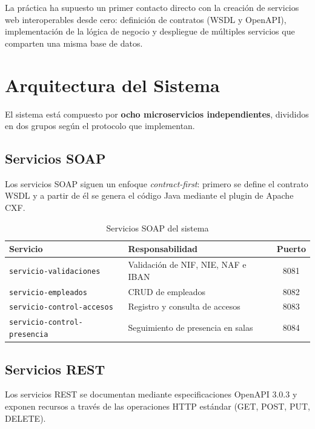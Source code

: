 \documentclass[12pt, a4paper]{article}
\begin{document}
La práctica ha supuesto un primer contacto directo con la creación de servicios web interoperables desde cero: definición de contratos (WSDL y OpenAPI), implementación de la lógica de negocio y despliegue de múltiples servicios que comparten una misma base de datos.

\section{Arquitectura del Sistema}

El sistema está compuesto por \textbf{ocho microservicios independientes}, divididos en dos grupos según el protocolo que implementan.

\subsection{Servicios SOAP}

Los servicios SOAP siguen un enfoque \textit{contract-first}: primero se define el contrato WSDL y a partir de él se genera el código Java mediante el plugin de Apache CXF.

\begin{table}[H]
  \centering
  \begin{tabular}{llc}
    \toprule
    \textbf{Servicio} & \textbf{Responsabilidad} & \textbf{Puerto} \\
    \midrule
    \texttt{servicio-validaciones}     & Validación de NIF, NIE, NAF e IBAN & 8081 \\
    \texttt{servicio-empleados}        & CRUD de empleados                   & 8082 \\
    \texttt{servicio-control-accesos}  & Registro y consulta de accesos      & 8083 \\
    \texttt{servicio-control-presencia}& Seguimiento de presencia en salas   & 8084 \\
    \bottomrule
  \end{tabular}
  \caption{Servicios SOAP del sistema}
\end{table}

\subsection{Servicios REST}

Los servicios REST se documentan mediante especificaciones OpenAPI 3.0.3 y exponen recursos a través de las operaciones HTTP estándar (GET, POST, PUT, DELETE).
\end{document}
